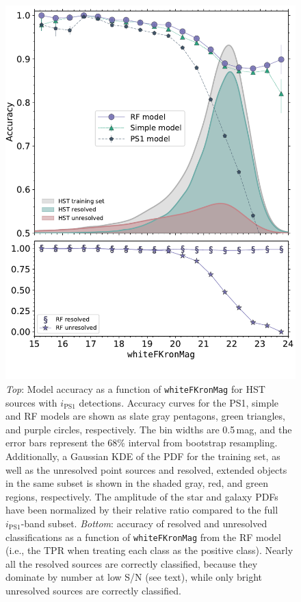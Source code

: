 \documentclass[twocolumn]{aastex63}
\begin{document}
\begin{figure}[t]
 \centering
  \includegraphics[width=\columnwidth]{./figures/CV_Accuracy_FHST.pdf}
  \caption{\textit{Top}: Model accuracy as a function of
  \texttt{whiteFKronMag} for HST sources with $i_\mathrm{PS1}$ detections.
  Accuracy curves for the PS1, simple and RF models are shown as slate gray
  pentagons, green triangles, and purple circles, respectively. The bin widths
  are 0.5\,mag, and the error bars represent the 68\% interval from bootstrap
  resampling. Additionally, a Gaussian KDE of the PDF for the training set, as
  well as the unresolved point sources and resolved, extended objects in the
  same subset is shown in the shaded gray, red, and green regions,
  respectively. The amplitude of the star and galaxy PDFs have been normalized
  by their relative ratio compared to the full $i_\mathrm{PS1}$-band subset.
  \textit{Bottom}: accuracy of resolved and unresolved classifications as a
  function of \texttt{whiteFKronMag} from the RF model (i.e., the TPR when
  treating each class as the positive class). Nearly all the resolved sources
  are correctly classified, because they dominate by number at low S/N (see
  text), while only bright unresolved sources are correctly classified.}
  \label{fig:hst_acc}
\end{figure}  
\end{document}
